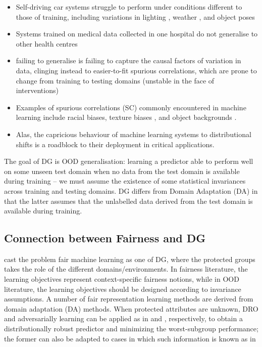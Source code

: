 \itemi\begin{itemize}
  \item Self-driving car systems struggle to perform under conditions different to those of 
    training, including variations in lighting \citep{dai2018dark}, weather \citep{volk2019towards}, 
    and object poses \citep{alcorn2019strike}
  \item Systems trained on medical data collected in one hospital do not generalise to other health
    centres \citep{castro2020causality, albadawy2018deep}
  \item failing to generalise is failing to capture the causal factors of variation in data, 
    clinging instead to easier-to-fit spurious correlations, which are prone to change from 
    training to testing domains (unstable in the face of interventions)
  \item  Examples of spurious correlations (SC) commonly encountered in machine learning include 
    racial biases, texture biases \citep{geirhos2018imagenet}, and object backgrounds
    \citep{beery2018recognition} .
  \item Alas, the capricious behaviour of machine learning systems to distributional shifts is a 
    roadblock to their deployment in critical applications.
\end{itemize}

The goal of DG is OOD generalisation: learning a predictor able to perform well on some unseen test
domain when no data from the test domain is available during training -- we must assume the 
existence of some statistical invariances across training and testing domains.
DG differs from Domain Adaptation (DA) in that the latter assumes that the unlabelled data derived 
from the test domain is available during training.


\subsection{Connection between Fairness and DG}\label{ssec:fairml-dg-cxn}
\citet{creager2021environment} cast the problem fair machine learning as one of DG,
where the protected groups takes the role of the different domains/environments. In fairness
literature, the learning objectives represent context-specific fairness notions,
while in OOD literature, the learning objectives should be designed according to invariance 
assumptions.
A number of fair representation learning methods \citep{edwards2015censoring, madras2018learning}
are derived from domain adaptation (DA) methods.
When protected attributes are unknown, DRO and adversarially learning can be applied as in 
\citet{hashimoto2018fairness} and \citet{lahoti2020fairness}, respectively, to obtain a 
distributionally robust predictor and minimizing the worst-subgroup performance; the former can
also be adapted to cases in which such information is known as in \citet{sagawa2019distributionally} 

